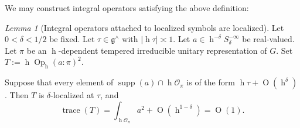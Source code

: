 \documentclass[reqno,10pt]{amsart}
\theoremstyle{plain} %
\theoremstyle{definition}
\theoremstyle{plain} %
\theoremstyle{remark}
\theoremstyle{itplain} %
\newtheorem{lemma}{Lemma}
\theoremstyle{remark} %
\numberwithin{equation}{section}
\DeclareMathOperator{\trace}{trace}
\def\O{\operatorname{O}}
\DeclareMathOperator{\Opp}{Op}
\DeclareMathOperator{\supp}{supp}
\DeclareMathOperator{\h}{h}
\begin{document}
We may construct integral operators satisfying the above definition:
\begin{lemma}[Integral operators attached to localized symbols are localized]
  Let $0 < \delta < 1/2$ be fixed.  Let $\tau \in \mathfrak{g}^\wedge$ with $|\h \tau| \asymp 1$.  Let $a \in \h^{-\delta} S^{-\infty}_{\delta}$ be real-valued.  Let $\pi$ be an $\h$-dependent tempered irreducible unitary representation of $G$.  Set $T := \h \Opp_{\h}(a:\pi)^2$.
  
  Suppose that every element of $\supp(a) \cap \h \mathcal{O}_\pi$ is of the form $\h \tau + \O(\h^\delta)$.  Then $T$ is $\delta$-localized at $\tau$, and
  \begin{equation}\label{eq:trace-estimate-in-localized-case}
    \trace(T)
    = \int_{\h \mathcal{O}_\pi} a^2 + \O(\h^{1-\delta})
    = \O(1).
  \end{equation}
\end{lemma}
\end{document}
